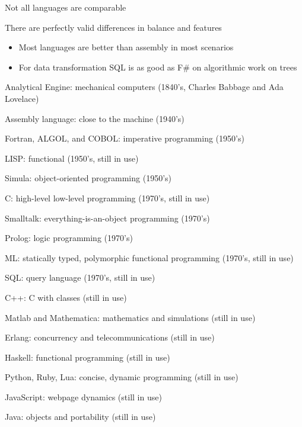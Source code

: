 \documentclass{beamer}
\begin{document}
\begin{slide}{
\item Not all languages are comparable
\item There are perfectly valid differences in balance and features
\begin{itemize}
\item Most languages are better than assembly in most scenarios
\item For data transformation SQL is as good as F\# on algorithmic work on trees
\end{itemize}
}\end{slide}

\begin{slide}{
\item Analytical Engine: mechanical computers (1840's, Charles Babbage and Ada Lovelace)
\item Assembly language: close to the machine (1940's)
\item Fortran, ALGOL, and COBOL: imperative programming (1950's)
\item LISP: functional (1950's, still in use)
\item Simula: object-oriented programming (1950's)
\item C: high-level low-level programming (1970's, still in use)
\item Smalltalk: everything-is-an-object programming (1970's)
\item Prolog: logic programming (1970's)
\item ML: statically typed, polymorphic functional programming (1970's, still in use)
\item SQL: query language (1970's, still in use)
}\end{slide}

\begin{slide}{
\item C++: C with classes (still in use)
\item Matlab and Mathematica: mathematics and simulations (still in use)
\item Erlang: concurrency and telecommunications (still in use)
}\end{slide}

\begin{slide}{
\item Haskell: functional programming (still in use)
\item Python, Ruby, Lua: concise, dynamic programming (still in use)
\item JavaScript: webpage dynamics (still in use)
\item Java: objects and portability (still in use)
}\end{slide}
\end{document}
